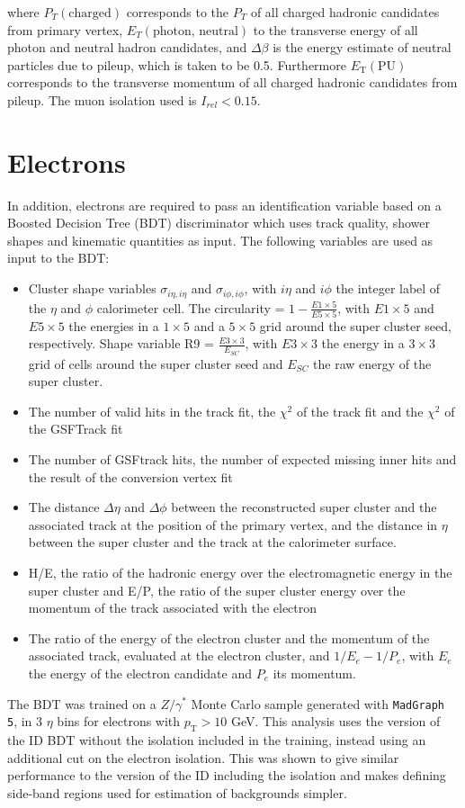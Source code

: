 where $P_{T}(\text{charged})$ corresponds to the $P_{T}$ of all charged hadronic candidates from primary vertex, $E_{T}(\text{photon, neutral})$ 
to the transverse energy of all photon and neutral hadron candidates, and $\Delta \beta$ is the energy estimate of neutral particles due to pileup, which is taken to be 0.5.
Furthermore $E_{\text{T}}(\text{PU})$ corresponds to the transverse momentum of all charged hadronic candidates from pileup.
The muon isolation used is $I_{rel}<0.15$.

\section{Electrons}

In addition, electrons are required to pass an identification variable based on a Boosted Decision Tree (BDT) 
discriminator which uses track quality, shower shapes and kinematic quantities as input.
The following variables are used as input to the BDT:  ~\cite{cmsElectron}
\begin{itemize}
\item Cluster shape variables $\sigma_{i\eta,i\eta}$ and $\sigma_{i\phi,i\phi}$, with $i\eta$ and $i\phi$ the integer
label of the $\eta$ and $\phi$ calorimeter cell. The circularity =  $1 -\frac{E1\times5}{E5\times5}$, with
$E1\times5$ and $E5\times5$ the energies in a $1\times5$ and a $5\times5$ grid around the super cluster seed,
respectively. Shape variable R9 = $\frac{E3\times3}{E_{SC}}$, with $E3\times3$ the energy in a $3\times3$ grid
of cells around the super cluster seed and $E_{SC}$ the raw energy of the super cluster.
\item The number of valid hits in the track fit, the $\chi^2$ of the track fit and the $\chi^2$ of the GSFTrack fit
\item The number of GSFtrack hits, the number of expected missing inner hits and the result of the conversion vertex fit
\item The distance $\Delta \eta$ and $\Delta \phi$ between the reconstructed super cluster and the associated track at the position of the primary vertex, and the distance in $\eta$ between the super cluster and the track at the calorimeter surface.
\item H/E, the ratio of the hadronic energy over the electromagnetic energy in the super cluster and E/P, the ratio of the super cluster energy over the momentum of the track associated with the electron 
\item The ratio of the energy of the electron cluster and the momentum of the associated track, evaluated at the electron cluster,
 and $1/E_e - 1/P_e$, with $E_e$ the energy of the electron candidate and $P_e$ its momentum.
\end{itemize}
The BDT was trained on a $Z/\gamma^{*}$ Monte Carlo sample generated with
\texttt{MadGraph 5}, in 3 $\eta$ bins for electrons with $p_{\text{T}}>10$ GeV.
This analysis uses the version of the ID BDT without the isolation included in
the training, instead using an additional cut on the electron isolation. This
was shown to give similar performance to the version of the ID including the
isolation and makes defining side-band regions used for estimation of
backgrounds simpler.

